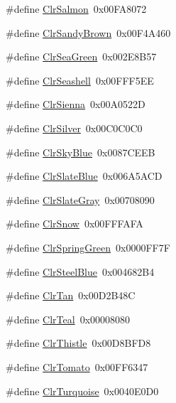 \begin{DoxyCompactItemize}
\item 
\#define \hyperlink{group__primitives__api_ga2abdc4417f918859ae6527fdab0113b3}{Clr\+Salmon}~0x00\+F\+A8072
\item 
\#define \hyperlink{group__primitives__api_gaee062f2b3a3dcdc05eadf22181733a96}{Clr\+Sandy\+Brown}~0x00\+F4\+A460
\item 
\#define \hyperlink{group__primitives__api_gaa7c057db9fba0c0130cf76b624c6562b}{Clr\+Sea\+Green}~0x002\+E8\+B57
\item 
\#define \hyperlink{group__primitives__api_gaebaf381a5d33a43c32e4bec29e97a125}{Clr\+Seashell}~0x00\+F\+F\+F5\+E\+E
\item 
\#define \hyperlink{group__primitives__api_ga4d77c8f462035b0d8c8c943e8d50dd05}{Clr\+Sienna}~0x00\+A0522\+D
\item 
\#define \hyperlink{group__primitives__api_ga82810494c9bc9aab9602212150bcaec1}{Clr\+Silver}~0x00\+C0\+C0\+C0
\item 
\#define \hyperlink{group__primitives__api_gabdc5d86d1f3c7265102355543568e37d}{Clr\+Sky\+Blue}~0x0087\+C\+E\+E\+B
\item 
\#define \hyperlink{group__primitives__api_ga55884a68f05931f9c461930daf97f8c3}{Clr\+Slate\+Blue}~0x006\+A5\+A\+C\+D
\item 
\#define \hyperlink{group__primitives__api_gae11a58d83b1e21f33f0a0dccb4716d5e}{Clr\+Slate\+Gray}~0x00708090
\item 
\#define \hyperlink{group__primitives__api_gad9b0e047ba19f203c3a9739f2657f226}{Clr\+Snow}~0x00\+F\+F\+F\+A\+F\+A
\item 
\#define \hyperlink{group__primitives__api_ga8845955e2a8559f479459ec5910e1e41}{Clr\+Spring\+Green}~0x0000\+F\+F7\+F
\item 
\#define \hyperlink{group__primitives__api_ga9cf6165c323eaab6e9ea2d90b32d25fb}{Clr\+Steel\+Blue}~0x004682\+B4
\item 
\#define \hyperlink{group__primitives__api_ga55415addcd9fb58b97caed65bf0a254b}{Clr\+Tan}~0x00\+D2\+B48\+C
\item 
\#define \hyperlink{group__primitives__api_gaf38369b3d8327e54994e0c399d9aa599}{Clr\+Teal}~0x00008080
\item 
\#define \hyperlink{group__primitives__api_ga56e900060236ee4c067dc9e59d61dd76}{Clr\+Thistle}~0x00\+D8\+B\+F\+D8
\item 
\#define \hyperlink{group__primitives__api_gae919ebee833261508d84caf85bc62e21}{Clr\+Tomato}~0x00\+F\+F6347
\item 
\#define \hyperlink{group__primitives__api_gad1575d02dd20fe5578281518c1f16981}{Clr\+Turquoise}~0x0040\+E0\+D0

\end{DoxyCompactItemize}
